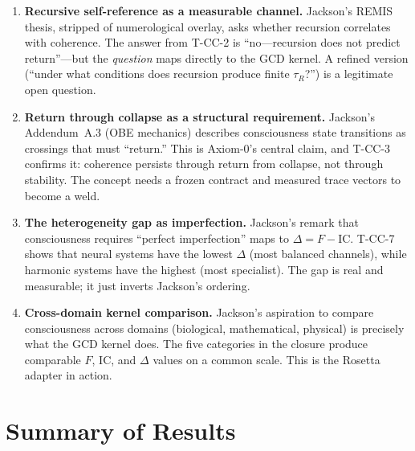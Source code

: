 \documentclass[
  aps,
  prd,
  twocolumn,
  superscriptaddress,
  nofootinbib,
  floatfix
]{revtex4-2}
\newcommand{\tR}{\tau_{\!R}}
\newcommand{\IC}{\mathrm{IC}}
\begin{document}
\begin{enumerate}
  \item \textbf{Recursive self-reference as a measurable channel.}
        Jackson's REMIS thesis, stripped of numerological overlay, asks
        whether recursion correlates with coherence.  The answer from
        T-CC-2 is ``no---recursion does not predict return''---but the
        \emph{question} maps directly to the GCD kernel.  A refined
        version (``under what conditions does recursion produce finite
        $\tR$?'') is a legitimate open question.

  \item \textbf{Return through collapse as a structural requirement.}
        Jackson's Addendum~A.3 (OBE mechanics) describes consciousness
        state transitions as crossings that must ``return.''  This is
        Axiom-0's central claim, and T-CC-3 confirms it: coherence
        persists through return from collapse, not through stability.
        The concept needs a frozen contract and measured trace vectors
        to become a weld.

  \item \textbf{The heterogeneity gap as imperfection.}
        Jackson's remark that consciousness requires ``perfect
        imperfection'' maps to $\Delta = F - \IC$.  T-CC-7 shows that
        neural systems have the lowest $\Delta$ (most balanced channels),
        while harmonic systems have the highest (most specialist).  The
        gap is real and measurable; it just inverts Jackson's ordering.

  \item \textbf{Cross-domain kernel comparison.}
        Jackson's aspiration to compare consciousness across domains
        (biological, mathematical, physical) is precisely what the
        GCD kernel does.  The five categories in the closure produce
        comparable $F$, $\IC$, and $\Delta$ values on a common scale.
        This is the Rosetta adapter in action.
\end{enumerate}

\section{Summary of Results}
\label{sec:results}
\end{document}
